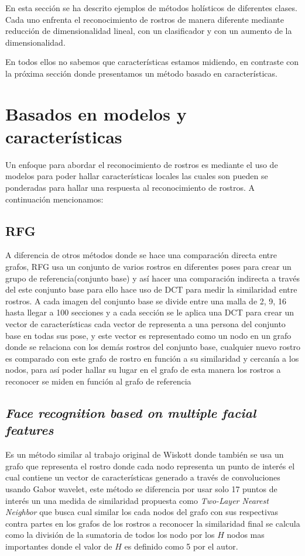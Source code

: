 
En esta sección se ha descrito ejemplos de métodos holísticos de diferentes clases. Cada uno enfrenta el reconocimiento de rostros de manera diferente mediante reducción de dimensionalidad lineal, con un clasificador y con un aumento de la dimensionalidad. 

En todos ellos no sabemos que características estamos midiendo, en contraste con la próxima sección donde presentamos un método basado en características.

\section{Basados en modelos y características}
Un enfoque para abordar el reconocimiento de rostros es mediante el uso de modelos para poder hallar características locales las cuales son pueden se ponderadas para hallar una respuesta al reconocimiento de rostros. A continuación mencionamos:

\subsection{\ac{RFG}}
A diferencia de otros métodos donde se hace una comparación directa entre grafos, \ac{RFG} \cite{kafai2014reference} usa un conjunto de varios rostros en diferentes poses para crear un grupo de referencia(conjunto base) y así hacer una comparación indirecta a través del este conjunto base para ello hace uso de \ac{DCT} para medir la similaridad entre rostros.
A cada imagen del conjunto base se divide entre una malla de 2, 9, 16 hasta llegar a 100 secciones y a cada sección se le aplica una \ac{DCT} para crear un vector de características cada vector de representa a una persona del conjunto base en todas sus pose, y este vector es representado como un nodo en un grafo donde se relaciona con los demás rostros del conjunto base, cualquier nuevo rostro es comparado con este grafo de rostro en función a su similaridad y cercanía a los nodos, para así poder hallar su lugar en el grafo de esta manera los rostros a reconocer se miden en función al grafo de referencia

\subsection{\textit{Face recognition based on multiple facial features}}
Es un método similar al trabajo original de Wiskott\cite{wiskott1997face} donde también se usa un grafo que representa el rostro donde cada nodo representa un punto de interés el cual contiene un vector de características generado a través de convoluciones usando Gabor wavelet, este método se diferencia por usar solo 17 puntos de interés un una medida de similaridad propuesta como \textit{Two-Layer Nearest Neighbor} \cite{liao2000face} que busca cual similar los cada nodos del grafo con sus respectivas contra partes en los grafos de los rostros a reconocer la similaridad final se calcula como la división de la sumatoria de todos los nodo por los $H$ nodos mas importantes donde el valor de $H$ es definido como 5 por el autor.

